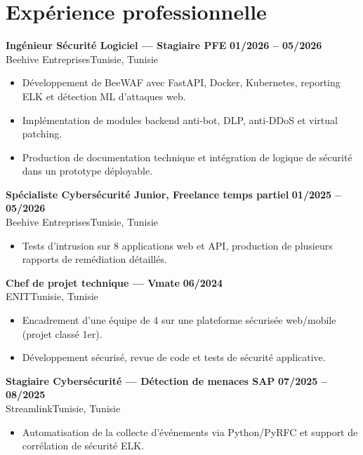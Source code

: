 \documentclass[a4paper,10pt]{article}
\newcommand{\cventry}[4]{\textbf{#1} \hfill \textbf{#4}\\[1pt]#2{\ifx\relax#3\relax\else, #3\fi}\par\vspace{2pt}}
\begin{document}
\section{Expérience professionnelle}
\cventry{Ingénieur Sécurité Logiciel --- Stagiaire PFE}{Beehive Entreprises}{Tunisie}{01/2026 -- 05/2026}
\begin{itemize}
  \item Développement de BeeWAF avec FastAPI, Docker, Kubernetes, reporting ELK et détection ML d'attaques web.
  \item Implémentation de modules backend anti-bot, DLP, anti-DDoS et virtual patching.
  \item Production de documentation technique et intégration de logique de sécurité dans un prototype déployable.
\end{itemize}
\cventry{Spécialiste Cybersécurité Junior, Freelance temps partiel}{Beehive Entreprises}{Tunisie}{01/2025 -- 05/2026}
\begin{itemize}
  \item Tests d'intrusion sur 8 applications web et API, production de plusieurs rapports de remédiation détaillés.
\end{itemize}
\cventry{Chef de projet technique — Vmate}{ENIT}{Tunisie}{06/2024}
\begin{itemize}
  \item Encadrement d'une équipe de 4 sur une plateforme sécurisée web/mobile (projet classé 1er).
  \item Développement sécurisé, revue de code et tests de sécurité applicative.
\end{itemize}
\cventry{Stagiaire Cybersécurité — Détection de menaces SAP}{Streamlink}{Tunisie}{07/2025 -- 08/2025}
\begin{itemize}
  \item Automatisation de la collecte d'événements via Python/PyRFC et support de corrélation de sécurité ELK.
\end{itemize}
\end{document}
